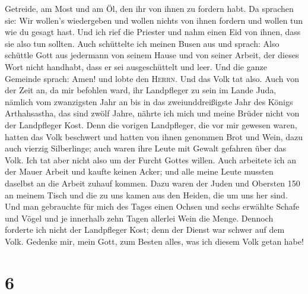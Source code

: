 Getreide, am Most und am Öl, den ihr von ihnen zu fordern habt.
 Da sprachen sie: Wir wollen's wiedergeben und wollen
nichts von ihnen fordern und wollen tun wie du gesagt hast. Und ich rief
die Priester und nahm einen Eid von ihnen, dass sie also tun sollten.
 Auch schüttelte ich meinen Busen aus und sprach: Also
schüttle Gott aus jedermann von seinem Hause und von seiner Arbeit, der
dieses Wort nicht handhabt, dass er sei ausgeschüttelt und leer. Und die
ganze Gemeinde sprach: Amen! und lobte den \textsc{Herrn}. Und das Volk
tat also.  Auch von der Zeit an, da mir befohlen ward,
ihr Landpfleger zu sein im Lande Juda, nämlich vom zwanzigsten Jahr an
bis in das zweiunddreißigste Jahr des Königs Arthahsastha, das sind
zwölf Jahre, nährte ich mich und meine Brüder nicht von der Landpfleger
Kost.  Denn die vorigen Landpfleger, die vor mir gewesen
waren, hatten das Volk beschwert und hatten von ihnen genommen Brot und
Wein, dazu auch vierzig Silberlinge; auch waren ihre Leute mit Gewalt
gefahren über das Volk. Ich tat aber nicht also um der Furcht Gottes
willen.  Auch arbeitete ich an der Mauer Arbeit und
kaufte keinen Acker; und alle meine Leute mussten daselbst an die Arbeit
zuhauf kommen.  Dazu waren der Juden und Obersten 150 an
meinem Tisch und die zu uns kamen aus den Heiden, die um uns her sind.
 Und man gebrauchte für mich des Tages einen Ochsen und
sechs erwählte Schafe und Vögel und je innerhalb zehn Tagen allerlei
Wein die Menge. Dennoch forderte ich nicht der Landpfleger Kost; denn
der Dienst war schwer auf dem Volk.  Gedenke mir, mein
Gott, zum Besten alles, was ich diesem Volk getan habe!

\hypertarget{section-5}{%
\section{6}\label{section-5}}

